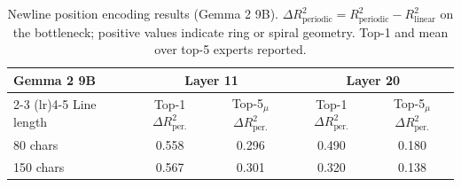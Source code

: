 \begin{table}[htbp]
\centering
\small
\caption{Newline position encoding results (Gemma 2 9B). $\Delta R^2_{\text{periodic}} = R^2_{\text{periodic}} - R^2_{\text{linear}}$ on the bottleneck; positive values indicate ring or spiral geometry. Top-1 and mean over top-5 experts reported.}
\label{tab:newline}
\begin{tabular}{l cc cc}
\toprule
\multicolumn{1}{l}{Gemma 2 9B} & \multicolumn{2}{c}{Layer 11} & \multicolumn{2}{c}{Layer 20} \\
\cmidrule(lr){2-3} \cmidrule(lr){4-5}
Line length & Top-1 $\Delta R^2_{\text{per.}}$ & Top-5$_{\mu}$ $\Delta R^2_{\text{per.}}$ & Top-1 $\Delta R^2_{\text{per.}}$ & Top-5$_{\mu}$ $\Delta R^2_{\text{per.}}$ \\
\midrule
80 chars & 0.558 & 0.296 & 0.490 & 0.180 \\
150 chars & 0.567 & 0.301 & 0.320 & 0.138 \\
\bottomrule
\end{tabular}
\end{table}